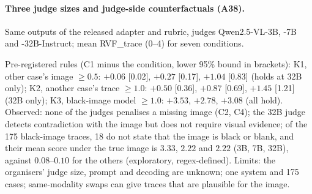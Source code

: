 \paragraph{Three judge sizes and judge-side counterfactuals (A38).}
Same outputs of the released adapter and rubric, judges Qwen2.5-VL-3B, -7B and -32B-Instruct; mean RVF\_trace (0--4) for seven conditions.
\begin{center}
\footnotesize
\setlength{\tabcolsep}{3pt}
\end{center}
Pre-registered rules (C1 minus the condition, lower 95\% bound in brackets): K1, other case's image $\ge0.5$: $+0.06$ [0.02], $+0.27$ [0.17], $+1.04$ [0.83] (holds at 32B only); K2, another case's trace $\ge1.0$: $+0.50$ [0.36], $+0.87$ [0.69], $+1.45$ [1.21] (32B only); K3, black-image model $\ge1.0$: $+3.53$, $+2.78$, $+3.08$ (all hold).
Observed: none of the judges penalises a missing image (C2, C4); the 32B judge detects contradiction with the image but does not require visual evidence; of the 175 black-image traces, 18 do not state that the image is black or blank, and their mean score under the true image is $3.33$, $2.22$ and $2.22$ (3B, 7B, 32B), against $0.08$--$0.10$ for the others (exploratory, regex-defined).
Limits: the organisers' judge size, prompt and decoding are unknown; one system and 175 cases; same-modality swaps can give traces that are plausible for the image.

